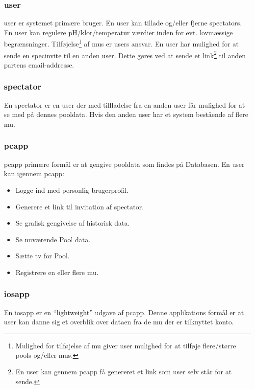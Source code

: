 \subsubsection{\gls{user}}
\gls{user} er systemet primære bruger. En \gls{user} kan tillade og/eller fjerne \glspl{spectator}. En \gls{user} kan regulere pH/klor/temperatur værdier inden for evt. lovmæssige begrænsninger. Tilføjelse\footnote{Mulighed for tilføjelse af  \gls{mu} giver \gls{user} mulighed for at tilføje flere/større \glspl{pool} og/eller \glspl{mu}.} af \glspl{mu} er \glspl{user} ansvar. En \gls{user} har mulighed for at sende en \gls{specinvite} til en anden \gls{user}. Dette gøres ved at sende et link\footnote{En \gls{user} kan gennem \gls{pcapp} få genereret et link som \gls{user} selv står for at sende.}  til anden partens email-addresse.


\subsubsection{\Gls{spectator}}
En \gls{spectator} er en \gls{user} der med tillladelse fra en anden \gls{user} får mulighed for at se med på dennes pooldata. Hvis den anden \gls{user} har et system bestående af flere \gls{mu}.

\subsubsection{\gls{pcapp}}
\gls{pcapp} primære formål er at gengive pooldata som findes på Databasen. En \gls{user} kan igennem \gls{pcapp}:

\begin{itemize}
	\item Logge ind med personlig brugerprofil.
	\item Generere et link til invitation af \gls{spectator}.
	\item Se grafisk gengivelse af historisk data.
	\item Se nuværende Pool data.
	\item Sætte \gls{tv} for Pool.
	\item Registrere en eller flere \gls{mu}.
\end{itemize}

\subsubsection{\gls{iosapp}}
En \gls{iosapp} er en “lightweight” udgave af \gls{pcapp}. Denne applikations formål er at \gls{user} kan danne sig et overblik over dataen fra de \gls{mu} der er tilknyttet konto.

